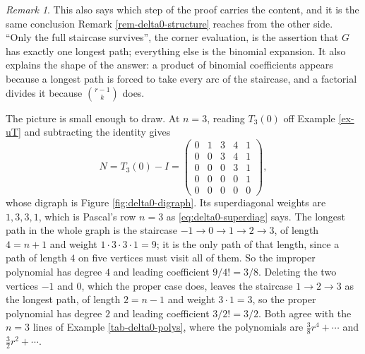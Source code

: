 \documentclass[11pt, a4paper, abstract=yes]{scrartcl}
\theoremstyle{definition}
\theoremstyle{remark}
\newtheorem{remark}[definition]{Remark}
\theoremstyle{plain}
\begin{document}
\begin{remark}
This also says which step of the proof carries the content, and it is the same conclusion
Remark \ref{rem-delta0-structure} reaches from the other side. ``Only the full staircase survives'', the
corner evaluation, is the assertion that \(G\) has exactly one longest path; everything else is the
binomial expansion. It also explains the shape of the answer: a product of binomial coefficients
appears because a longest path is forced to take every arc of the staircase, and a factorial divides
it because \(\binom{r-1}{k}\) does.

The picture is small enough to draw. At \(n=3\), reading \(T_3(0)\) off Example \ref{ex-uT} and
subtracting the identity gives
\[
  N=T_3(0)-I=\begin{pmatrix}
    0&1&3&4&1\\ 0&0&3&4&1\\ 0&0&0&3&1\\ 0&0&0&0&1\\ 0&0&0&0&0
  \end{pmatrix},
\]
whose digraph is Figure \ref{fig:delta0-digraph}. Its superdiagonal weights are
\(1,3,3,1\), which is Pascal's row \(n=3\) as \eqref{eq:delta0-superdiag} says. The longest path
in the whole graph is the staircase \(-1\to0\to1\to2\to3\), of length \(4=n+1\) and weight
\(1\cdot3\cdot3\cdot1=9\); it is the only path of that length, since a path of length \(4\) on
five vertices must visit all of them. So the improper polynomial has degree \(4\) and leading
coefficient \(9/4!=3/8\). Deleting the two vertices \(-1\) and \(0\), which the proper case
does, leaves the staircase \(1\to2\to3\) as the longest path, of length \(2=n-1\) and weight
\(3\cdot1=3\), so the proper polynomial has degree \(2\) and leading coefficient \(3/2!=3/2\).
Both agree with the \(n=3\) lines of Example \ref{tab-delta0-polys}, where the polynomials are
\(\tfrac38r^4+\cdots\) and \(\tfrac32r^2+\cdots\).


\end{remark}
\end{document}
